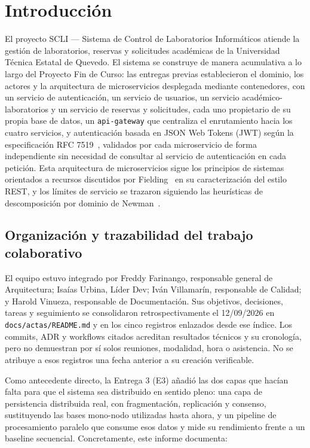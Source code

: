 \documentclass[10pt,twocolumn]{article}
\begin{document}
\vspace{6pt}

\section{Introducción}
\label{sec:intro}

El proyecto SCLI --- Sistema de Control de Laboratorios Informáticos atiende
la gestión de laboratorios, reservas y solicitudes académicas de la
Universidad Técnica Estatal de Quevedo. El sistema se construye de manera
acumulativa a lo largo del Proyecto Fin de Curso: las entregas previas
establecieron el dominio, los actores y la arquitectura de microservicios
desplegada mediante contenedores, con un servicio de autenticación, un
servicio de usuarios, un servicio académico-laboratorios y un servicio de
reservas y solicitudes, cada uno propietario de su propia base de datos, un
\texttt{api-gateway} que centraliza el enrutamiento hacia los cuatro
servicios, y autenticación basada en JSON Web Tokens (JWT) según la
especificación RFC 7519~\cite{jones2015jwt}, validados por cada microservicio de
forma independiente sin necesidad de consultar al servicio de
autenticación en cada petición. Esta arquitectura de microservicios sigue
los principios de sistemas orientados a recursos discutidos por
Fielding~\cite{fielding2000rest} en su caracterización del estilo REST, y los
límites de servicio se trazaron siguiendo las heurísticas de descomposición
por dominio de Newman~\cite{newman2015microservices}.

\subsection{Organización y trazabilidad del trabajo colaborativo}

El equipo estuvo integrado por Freddy Farinango, responsable general de
Arquitectura; Isaías Urbina, Líder Dev; Iván Villamarín, responsable de
Calidad; y Harold Vinueza, responsable de Documentación. Sus objetivos,
decisiones, tareas y seguimiento se consolidaron retrospectivamente el
12/09/2026 en \texttt{docs/actas/README.md} y en los cinco registros enlazados
desde ese índice. Los commits, ADR y workflows citados acreditan resultados
técnicos y su cronología, pero no demuestran por sí solos reuniones, modalidad,
hora o asistencia. No se atribuye a esos registros una fecha anterior a su
creación verificable.

Como antecedente directo, la Entrega 3 (E3) añadió las dos capas que hacían
falta para que el sistema
sea distribuido en sentido pleno: una capa de persistencia distribuida real,
con fragmentación, replicación y consenso, sustituyendo las bases mono-nodo
utilizadas hasta ahora, y un pipeline de procesamiento paralelo que
consume esos datos y mide su rendimiento frente a un baseline secuencial.
Concretamente, este informe documenta:
\end{document}
